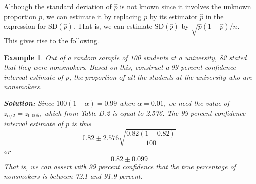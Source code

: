\documentclass[12pt,a4paper]{article}
\theoremstyle{example}
\newtheorem{example}{Example}
\theoremstyle{definition}
\theoremstyle{theorem}
\begin{document}
Although the standard deviation of \(\hat{p}\) is not known since it involves the unknown proportion \(p\), we can estimate it by replacing \(p\) by its estimator \(\hat{p}\) in the expression for \(\text{SD}(\hat{p})\). That is, we can estimate \(\text{SD}(\hat{p})\) by \(\sqrt{\hat{p}(1 - \hat{p})/n}\). This gives rise to the following.

\begin{example}\citep{ross2017introductory}
    Out of a random sample of 100 students at a university, 82 stated that they were nonsmokers. Based on this, construct a 99 percent confidence interval estimate of \(p\), the proportion of all the students at the university who are nonsmokers.

\textbf{Solution:}
Since \(100(1 - \alpha) = 0.99\) when \(\alpha = 0.01\), we need the value of \(z_{\alpha/2} = z_{0.005}\), which from Table D.2 is equal to 2.576. The 99 percent confidence interval estimate of \(p\) is thus
\[
0.82 \pm 2.576 \sqrt{\frac{0.82(1 - 0.82)}{100}}
\]
or
\[
0.82 \pm 0.099
\]
That is, we can assert with 99 percent confidence that the true percentage of nonsmokers is between 72.1 and 91.9 percent.

\end{example}
\end{document}
